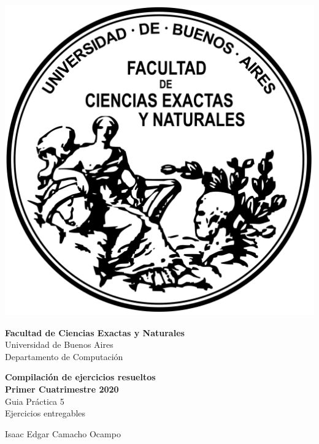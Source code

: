 \documentclass[12pt]{book}
\begin{document}
\thispagestyle{empty}

\begin {center}

\includegraphics[scale=.4]{Logo-fcenuba.png}

\medskip
\textbf{Facultad de Ciencias Exactas y Naturales}
\\
Universidad de Buenos Aires
\\
Departamento de Computación

\vspace{3cm}


\textbf{\large  Compilación de ejercicios resueltos}\\
\textbf{Primer Cuatrimestre 2020}
\\    Guia Pr\'actica 5
\\ Ejercicios entregables
\vspace{2cm}




\end {center}


\vspace{2.5cm}

\noindent Isaac Edgar Camacho Ocampo
 
\vspace{1cm}

\vspace{1cm}
\end{document}
